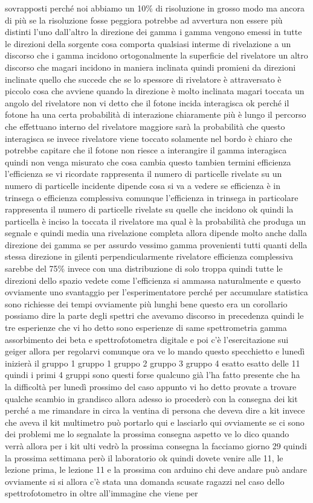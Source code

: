 sovrapposti perché noi abbiamo un 10\% di risoluzione in grosso modo ma ancora di più se la risoluzione fosse peggiora potrebbe ad avvertura non essere più distinti l'uno dall'altro la direzione dei gamma i gamma vengono emessi in tutte le direzioni della sorgente cosa comporta qualsiasi interme di rivelazione a un discorso che i gamma incidono ortogonalmente la superficie del rivelatore un altro discorso che magari incidono in maniera inclinata quindi promieni da direzioni inclinate quello che succede che se lo spessore di rivelatore è attraversato è piccolo cosa che avviene quando la direzione è molto inclinata magari toccata un angolo del rivelatore non vi detto che il fotone incida interagisca ok perché il fotone ha una certa probabilità di interazione chiaramente più è lungo il percorso che effettuano interno del rivelatore maggiore sarà la probabilità che questo interagisca se invece rivelatore viene toccato solamente nel bordo è chiaro che potrebbe capitare che il fotone non riesce a interangire il gamma interagisca quindi non venga misurato che cosa cambia questo tambien termini efficienza l'efficienza se vi ricordate rappresenta il numero di particelle rivelate su un numero di particelle incidente dipende cosa si va a vedere se efficienza è in trinsega o efficienza complessiva comunque l'efficienza in trinsega in particolare rappresenta il numero di particelle rivelate su quelle che incidono ok quindi la particella è inciso la toccata il rivelatore ma qual è la probabilità che produga un segnale e quindi media una rivelazione completa allora dipende molto anche dalla direzione dei gamma se per assurdo vessimo gamma provenienti tutti quanti della stessa direzione in gilenti perpendicularmente rivelatore efficienza complessiva sarebbe del 75\% invece con una distribuzione di solo troppa quindi tutte le direzioni dello spazio vedete come l'efficienza si ammassa naturalmente e questo ovviamente uno svantaggio per l'esperimentatore perché per accumulare statistica sono richiesse dei tempi ovviamente più lunghi bene questo era un corollario possiamo dire la parte degli spettri che avevamo discorso in precedenza quindi le tre esperienze che vi ho detto sono esperienze di same spettrometria gamma assorbimento dei beta e spettrofotometra digitale e poi c'è l'esercitazione sui geiger allora per regolarvi comunque ora ve lo mando questo specchietto e lunedì inizierà il gruppo 1 gruppo 1 gruppo 2 gruppo 3 gruppo 4 esatto esatto delle 11 quindi i primi 4 gruppi sono questi forse qualcuno già l'ha fatto presente che ha la difficoltà per lunedì prossimo del caso appunto vi ho detto provate a trovare qualche scambio in grandisco allora adesso io procederò con la consegna dei kit perché a me rimandare in circa la ventina di persona che deveva dire a kit invece che aveva il kit multimetro può portarlo qui e lasciarlo qui ovviamente se ci sono dei problemi me lo segnalate la prossima consegna aspetto ve lo dico quando verrà allora per i kit ulti vedrò la prossima consegna la facciamo giorno 29 quindi la prossima settimana però il laboratorio ok quindi dovete venire alle 11, le lezione prima, le lezione 11 e la prossima con arduino chi deve andare può andare ovviamente si si allora c'è stata una domanda scusate ragazzi nel caso dello spettrofotometro in oltre all'immagine che viene per 